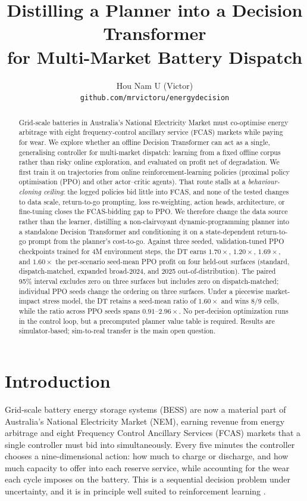 \documentclass{article}
\title{Distilling a Planner into a Decision Transformer\\ for Multi-Market Battery Dispatch}
\author{%
  Hou Nam U (Victor) \\
  \texttt{github.com/mrvictoru/energydecision} \\
}
\begin{document}
\maketitle

\begin{abstract}
Grid-scale batteries in Australia's National Electricity Market must
co-optimise energy arbitrage with eight frequency-control ancillary service
(FCAS) markets while paying for wear. We explore whether an offline Decision
Transformer can act as a single, generalising controller for multi-market
dispatch: learning from a fixed offline corpus rather than risky online
exploration, and evaluated on profit net of degradation. We first train it on
trajectories from online reinforcement-learning policies (proximal policy
optimisation (PPO) and other actor--critic agents). That route stalls at a
\emph{behaviour-cloning ceiling}: the logged policies bid little into FCAS, and
none of the tested changes to data scale, return-to-go prompting, loss
re-weighting, action heads, architecture, or fine-tuning closes the
FCAS-bidding gap to PPO. We therefore change the data source rather than the
learner, distilling a non-clairvoyant dynamic-programming planner into a
standalone Decision Transformer and conditioning it on a state-dependent
return-to-go prompt from the planner's cost-to-go. Against three seeded,
validation-tuned PPO checkpoints trained for 4M environment steps, the DT earns
$1.70\times$, $1.20\times$, $1.69\times$, and $1.60\times$ the per-scenario
seed-mean PPO profit on four held-out surfaces (standard, dispatch-matched,
expanded broad-2024, and 2025 out-of-distribution). The paired 95\% interval
excludes zero on three surfaces but includes zero on dispatch-matched;
individual PPO seeds change the ordering on three surfaces. Under a piecewise
market-impact stress model, the DT retains a seed-mean ratio of $1.60\times$
and wins 8/9 cells, while the ratio across PPO seeds spans $0.91$--$2.96\times$.
No per-decision optimization runs in the control loop, but a precomputed
planner value table is required. Results are simulator-based; sim-to-real
transfer is the main open question.
\end{abstract}

\section{Introduction}
Grid-scale battery energy storage systems (BESS) are now a material part of
Australia's National Electricity Market (NEM), earning revenue from energy
arbitrage and eight Frequency Control Ancillary Services (FCAS) markets that a
single controller must bid into simultaneously. Every five minutes the controller
chooses a nine-dimensional action: how much to charge or discharge, and how much
capacity to offer into each reserve service, while accounting for the wear each
cycle imposes on the battery. This is a sequential decision problem under
uncertainty, and it is in principle well suited to reinforcement learning
\citep{subramanya2022review}.
\end{document}
